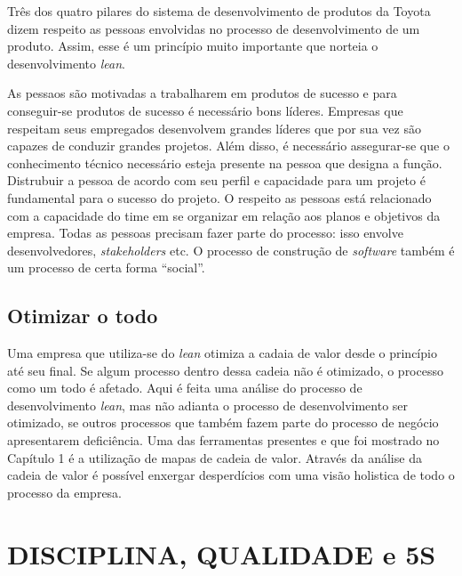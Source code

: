 Três dos quatro pilares do sistema de desenvolvimento de produtos da Toyota dizem respeito as pessoas envolvidas no processo de desenvolvimento de um produto. Assim, esse é um princípio muito importante que norteia o desenvolvimento \textit{lean}.

As pessaos são motivadas a trabalharem em produtos de sucesso e para conseguir-se produtos de sucesso é necessário bons líderes. Empresas que respeitam seus empregados desenvolvem grandes líderes que por sua vez são capazes de conduzir grandes projetos. Além disso, é necessário assegurar-se que o conhecimento técnico necessário esteja presente na pessoa que designa a função. Distrubuir a pessoa de acordo com seu perfil e capacidade para um projeto é fundamental para o sucesso do projeto. O respeito as pessoas está relacionado com a capacidade do time em se organizar em relação aos planos e objetivos da empresa. Todas as pessoas precisam fazer parte do processo: isso envolve desenvolvedores, \textit{stakeholders} etc. O processo de construção de \textit{software} também é um processo de certa forma ``social''.

\subsection{Otimizar o todo}

Uma empresa que utiliza-se do \textit{lean} otimiza a cadaia de valor desde o princípio até seu final. Se algum processo dentro dessa cadeia não é otimizado, o processo como um todo é afetado. Aqui é feita uma análise do processo de desenvolvimento \textit{lean}, mas não adianta o processo de desenvolvimento ser otimizado, se outros processos que também fazem parte do processo de negócio apresentarem deficiência. Uma das ferramentas presentes e que foi mostrado no Capítulo 1 é a utilização de mapas de cadeia de valor. Através da análise da cadeia de valor é possível enxergar desperdícios com uma visão holistica de todo o processo da empresa. 

\section{DISCIPLINA, QUALIDADE e 5S}

